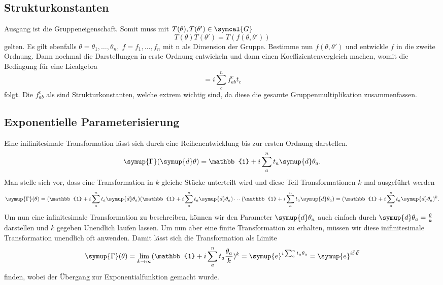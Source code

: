\documentclass[
  captions=tableheading,  %
  titlepage=firstiscover, %
]{scrartcl}
\begin{document}
\subsection{Strukturkonstanten}
Ausgang ist die Gruppeneigenschaft. 
Somit muss mit $T(\theta), T(\theta') \in \symcal{G}$ 
\begin{equation*}
  T(\theta)T(\theta') = T(f(\theta, \theta'))
\end{equation*} gelten.
Es gilt ebenfalls $\theta = \theta_1, \ldots, \theta_n, \; f = f_1, \ldots, f_n$ mit n als Dimension der Gruppe.
Bestimme nun $f(\theta, \theta')$ und entwickle $f$ in die zweite Ordnung.
Dann nochmal die Darstellungen in erste Ordnung entwickeln und dann einen Koeffizientenvergleich machen, womit 
die Bedingung für eine Liealgebra
\begin{equation*}
  [t_a, t_b] = i \sum_c^n f_{ab}^ct_c
\end{equation*}
folgt. 
Die $f_{ab}^c$ als sind Strukturkonstanten,
welche extrem wichtig sind, da diese die gesamte Gruppenmultiplikation zusammenfassen.
\subsection{Exponentielle Parameterisierung}
\label{sub:exp}
Eine inifinitesimale Transformation lässt sich durch eine Reihenentwicklung bis zur ersten Ordnung darstellen.
\begin{equation*}
  \symup{\Gamma}(\symup{d}\theta) = \mathbb{1} + i \sum_a^n t_a \symup{d}\theta_a.
\end{equation*}
Man stelle sich vor, dass eine Transformation in $k$ gleiche Stücke unterteilt wird und diese Teil-Transformationen
$k$ mal ausgeführt werden
\begin{equation*}
  \symup{\Gamma}(\theta) = (\mathbb{1} + i \sum_a^n t_a \symup{d}\theta_a)(\mathbb{1} + i \sum_a^n t_a \symup{d}\theta_a)
  \cdots (\mathbb{1} + i \sum_a^n t_a \symup{d}\theta_a)
  = (\mathbb{1} + i \sum_a^n t_a \symup{d}\theta_a)^k.
\end{equation*}
Um nun eine infinitesimale Transformation zu beschreiben, können wir den Parameter 
$\symup{d}\theta_a$ auch einfach durch $\symup{d}\theta_a = \frac{\theta}{k}$ darstellen und $k$ gegeben
Unendlich laufen lassen.
Um nun aber eine finite Transformation zu erhalten, müssen wir diese inifinitesimale Transformation unendlich oft anwenden.
Damit lässt sich die Transformation als Limite
\begin{equation*}
  \symup{\Gamma}(\theta) = \lim_{k \to \infty} (\mathbb{1} + i \sum_a^n t_a \frac{\theta_a}{k})^k = \symup{e}^{i\sum_a^n t_a \theta_a}
  = \symup{e}^{i\vec{t} \cdot \vec{\theta}}
\end{equation*}
finden, wobei der Übergang zur Exponentialfunktion gemacht wurde.
\end{document}
